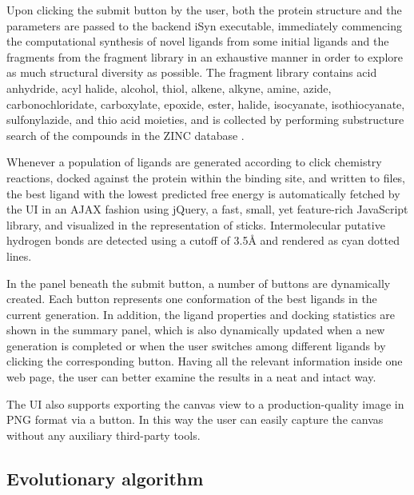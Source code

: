 Upon clicking the submit button by the user, both the protein structure and the parameters are passed to the backend iSyn executable, immediately commencing the computational synthesis of novel ligands from some initial ligands and the fragments from the fragment library in an exhaustive manner in order to explore as much structural diversity as possible. The fragment library contains acid anhydride, acyl halide, alcohol, thiol, alkene, alkyne, amine, azide, carbonochloridate, carboxylate, epoxide, ester, halide, isocyanate, isothiocyanate, sulfonylazide, and thio acid moieties, and is collected by performing substructure search of the compounds in the ZINC database \citep{532,1178}.

Whenever a population of ligands are generated according to click chemistry reactions, docked against the protein within the binding site, and written to files, the best ligand with the lowest predicted free energy is automatically fetched by the UI in an AJAX fashion using jQuery, a fast, small, yet feature-rich JavaScript library, and visualized in the representation of sticks. Intermolecular putative hydrogen bonds are detected using a cutoff of 3.5Å and rendered as cyan dotted lines.

In the panel beneath the submit button, a number of buttons are dynamically created. Each button represents one conformation of the best ligands in the current generation. In addition, the ligand properties and docking statistics are shown in the summary panel, which is also dynamically updated when a new generation is completed or when the user switches among different ligands by clicking the corresponding button. Having all the relevant information inside one web page, the user can better examine the results in a neat and intact way.

The UI also supports exporting the canvas view to a production-quality image in PNG format via a button. In this way the user can easily capture the canvas without any auxiliary third-party tools.

\subsection{Evolutionary algorithm}

